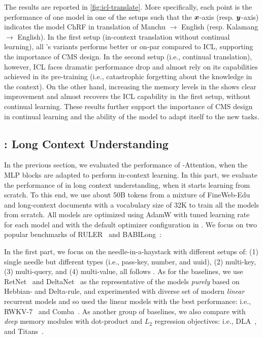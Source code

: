The results are reported in \autoref{fig:icl-translate}. More specifically, each point is the performance of one model in one of the setups such that the $\boldsymbol{x}$-axis (resp. $\boldsymbol{y}$-axis) indicates the model ChRF in translation of Manchu $\rightarrow$ English (resp. Kalamang $\rightarrow$ English). In the first setup (in-context translation without continual learning), all \model's variants performs better or on-par compared to ICL, supporting the importance of CMS design. In the second setup (i.e., continual translation), however, ICL faces dramatic performance drop and almost rely on its capabilities achieved in its pre-training (i.e., catastrophic forgetting about the knowledge in the context). On the other hand, increasing the memory levels in the \model{} shows clear improvement and  almost recovers the ICL capability in the first setup, without continual learning. These results further support the importance of CMS design in continual learning and the ability of the model to adapt itself to the new tasks. 








\subsection{\model: Long Context Understanding}\label{sec:exp-niah}
In the previous section, we evaluated the performance of \model-Attention, when the MLP blocks are adapted to perform in-context learning. In this part, we evaluate the performance of \model{} in long context understanding, when it starts learning from scratch. To this end, we use about 50B tokens from a mixture of FineWeb-Edu~\citep{penedo2024fineweb} and long-context documents with a vocabulary size of 32K to train all the models from scratch. All models are optimized using AdamW with tuned learning rate for each model and with the default optimizer configuration in \citet{behrouz2024titans}. We focus on two popular benchmarks of RULER~\citep{hsieh2024ruler} and BABILong~\citep{kuratov2024babilong}:




In the first part, we focus on the needle-in-a-haystack with different setups of: (1) single needle but different types (i.e., pass-key, number, and uuid), (2) multi-key, (3) multi-query, and (4) multi-value, all follows \citet{hsieh2024ruler}. As for the baselines, we use RetNet~\citep{sun2023retentive} and DeltaNet~\citep{schlag2021linear} as the representative of the models \emph{purely} based on Hebbian- and Delta-rule, and experimented with diverse set of modern \emph{linear} recurrent models and so used the linear models with the best performance: i.e., RWKV-7~\citep{rwkv-repo} and Comba~\citep{hu2025improving}. As another group of baselines, we also compare with \emph{deep} memory modules with dot-product and $L_2$ regression objectives: i.e., DLA~\citep{behrouz2025atlas}, and Titans~\citep{behrouz2024titans}.


